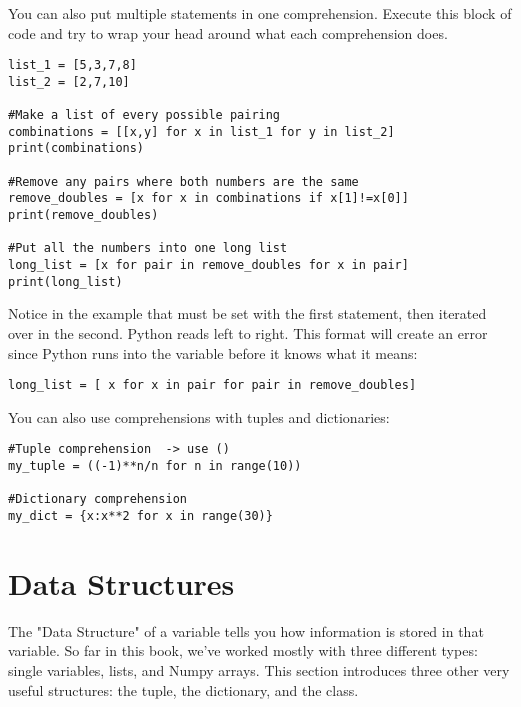 You can also put multiple  statements in one comprehension.  Execute this block of code and try to wrap your head around what each comprehension does.
\begin{Verbatim}
list_1 = [5,3,7,8]
list_2 = [2,7,10]

#Make a list of every possible pairing
combinations = [[x,y] for x in list_1 for y in list_2]
print(combinations)

#Remove any pairs where both numbers are the same
remove_doubles = [x for x in combinations if x[1]!=x[0]]
print(remove_doubles)

#Put all the numbers into one long list
long_list = [x for pair in remove_doubles for x in pair]
print(long_list)
\end{Verbatim}
Notice in the  example that  must be set with the first  statement, then iterated over in the second. Python reads left to right.  This format will create an error since Python runs into the variable  before it knows what it means:
\begin{Verbatim}
long_list = [ x for x in pair for pair in remove_doubles]
\end{Verbatim}


You can also use comprehensions with tuples and dictionaries:
\begin{Verbatim}
#Tuple comprehension  -> use ()
my_tuple = ((-1)**n/n for n in range(10))

#Dictionary comprehension
my_dict = {x:x**2 for x in range(30)}
\end{Verbatim}




\section{Data Structures}\label{sec:datastruct}
The "Data Structure" of a variable tells you how information is stored in that variable.  So far in this book, we've worked mostly with three different types: single variables, lists, and Numpy arrays. This section introduces three other very useful structures: the tuple, the dictionary, and the class.

